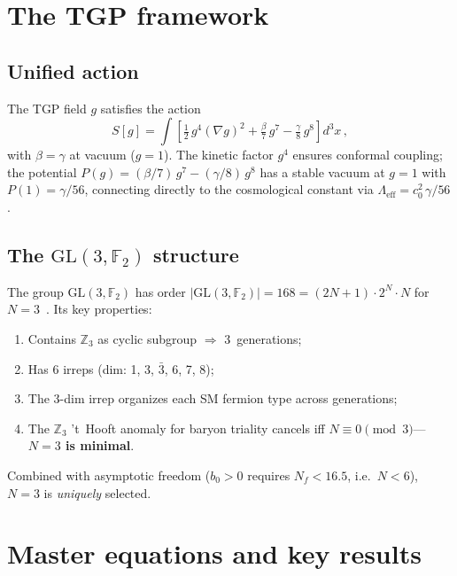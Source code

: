 \documentclass[aps,prl,twocolumn,superscriptaddress,showpacs,floatfix]{revtex4-2}
\newcommand{\GL}{\mathrm{GL}(3,\mathbb{F}_2)}
\begin{document}
\section{The TGP framework}

\subsection{Unified action}

The TGP field $g$ satisfies the action
\begin{equation}\label{eq:action}
  S[g] = \int\!\left[
    \tfrac{1}{2}\,g^4(\nabla g)^2
    + \tfrac{\beta}{7}\,g^7
    - \tfrac{\gamma}{8}\,g^8
  \right] d^3x\,,
\end{equation}
with $\beta = \gamma$ at vacuum ($g=1$).
The kinetic factor $g^4$ ensures conformal coupling; the potential
$P(g) = (\beta/7)\,g^7 - (\gamma/8)\,g^8$
has a stable vacuum at $g=1$ with $P(1) = \gamma/56$,
connecting directly to the cosmological constant via
$\Lambda_{\mathrm{eff}} = c_0^2\,\gamma/56$.


\subsection{The \texorpdfstring{$\GL$}{GL(3,F2)} structure}

The group $\GL$ has order
$|\GL| = 168 = (2N{+}1)\cdot 2^N\cdot N$ for $N=3$~\cite{GL3F2}.
Its key properties:
\begin{enumerate}
\item Contains $\mathbb{Z}_3$ as cyclic subgroup $\Rightarrow$ 3~generations;
\item Has 6 irreps (dim: 1, 3, $\bar{3}$, 6, 7, 8);
\item The 3-dim irrep organizes each SM fermion type across generations;
\item The $\mathbb{Z}_3$ 't~Hooft anomaly for baryon triality cancels
  iff $N \equiv 0 \pmod{3}$---\textbf{$N=3$ is minimal}.
\end{enumerate}
Combined with asymptotic freedom ($b_0 > 0$ requires $N_f < 16.5$,
i.e.\ $N < 6$), $N=3$ is \emph{uniquely} selected.


\section{Master equations and key results}
\end{document}
